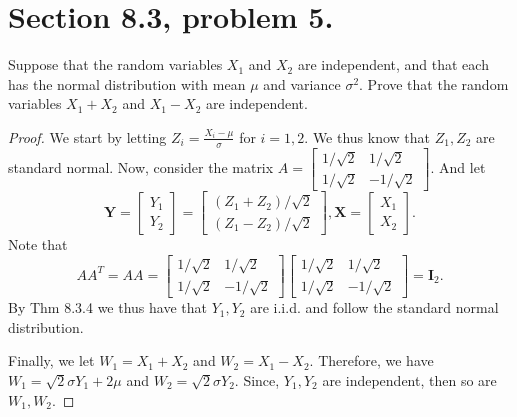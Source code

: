 \documentclass{article}
\newenvironment{hwproof}[1]
{
    #1
    \begin{proof}
}{
    \end{proof}
}
\begin{document}
\section{Section 8.3, problem 5.}
\begin{hwproof}
    {
        Suppose that the random variables $X_1$ and $X_2$ are independent, and that
        each has the normal distribution with mean $\mu$ and variance $\sigma^2$.
        Prove that the random variables $X_1 + X_2$ and $X_1 - X_2$ are
        independent.
    }
    We start by letting $Z_i = \frac{X_i - \mu}{\sigma}$ for $i = 1,2$. We thus
    know that $Z_1, Z_2$ are standard normal. Now, consider the matrix
    $A = \begin{bmatrix}
            1/\sqrt{2}   & 1/\sqrt{2}    \\
            1 / \sqrt{2} & -1 / \sqrt{2}
        \end{bmatrix}$.
    And let
    \begin{equation*}
        \bm{Y} = \begin{bmatrix}
            Y_1 \\ Y_2
        \end{bmatrix}
        = \begin{bmatrix}
            (Z_1 + Z_2) / \sqrt{2} \\
            (Z_1 - Z_2) / \sqrt{2}
        \end{bmatrix},
        \bm{X} = \begin{bmatrix}
            X_1 \\ X_2
        \end{bmatrix}.
    \end{equation*}
    Note that
    \begin{equation*}
        AA^T = AA = \begin{bmatrix}
            1/\sqrt{2}   & 1/\sqrt{2}    \\
            1 / \sqrt{2} & -1 / \sqrt{2}
        \end{bmatrix}
        \begin{bmatrix}
            1/\sqrt{2}   & 1/\sqrt{2}    \\
            1 / \sqrt{2} & -1 / \sqrt{2}
        \end{bmatrix}
        = \bm{I}_2.
    \end{equation*}
    By Thm 8.3.4 we thus have that $Y_1, Y_2$ are i.i.d. and follow the
    standard normal distribution.

    Finally, we let $W_1 = X_1 + X_2$ and $W_2 = X_1 - X_2$. Therefore, we have
    $W_1 = \sqrt{2}\sigma Y_1 + 2\mu$ and $W_2 = \sqrt{2}\sigma Y_2$.
    Since, $Y_1, Y_2$ are independent, then so are $W_1, W_2$.

\end{hwproof}
\end{document}
